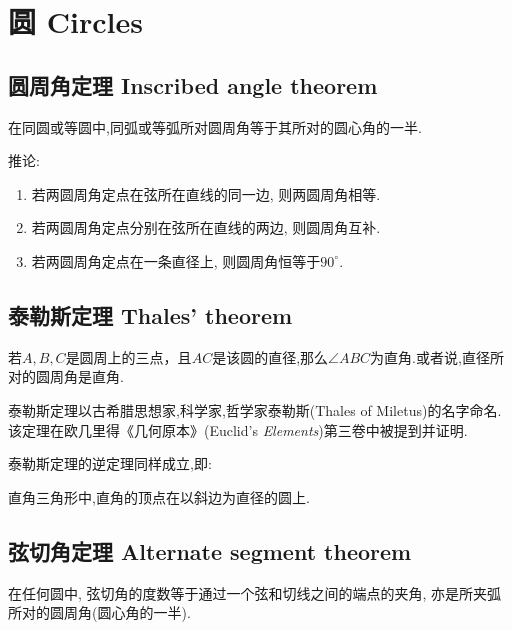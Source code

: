 \chapter{圆 Circles}

\section{圆周角定理 Inscribed angle theorem}

\begin{theorem}
  在同圆或等圆中,同弧或等弧所对圆周角等于其所对的圆心角的一半.
\end{theorem}

推论:
\begin{enumerate}
  \item 若两圆周角定点在弦所在直线的同一边, 则两圆周角相等.
  \item 若两圆周角定点分别在弦所在直线的两边, 则圆周角互补.
  \item 若两圆周角定点在一条直径上, 则圆周角恒等于$90^\circ$.
\end{enumerate}

\section{泰勒斯定理 Thales' theorem}

\begin{theorem}
  若$A,B,C$是圆周上的三点，且$AC$是该圆的直径,那么$\angle ABC$为直角.或者说,直径所对的圆周角是直角.
\end{theorem}

泰勒斯定理以古希腊思想家,科学家,哲学家泰勒斯(Thales of Miletus)的名字命名. 该定理在欧几里得《几何原本》(Euclid's {\itshape Elements})第三卷中被提到并证明.

泰勒斯定理的逆定理同样成立,即:

\begin{theorem}[泰勒斯定理的逆定理]
  直角三角形中,直角的顶点在以斜边为直径的圆上.
\end{theorem}

\section{弦切角定理 Alternate segment theorem}

\begin{theorem}
  在任何圆中, 弦切角的度数等于通过一个弦和切线之间的端点的夹角, 亦是所夹弧所对的圆周角(圆心角的一半).
\end{theorem}

